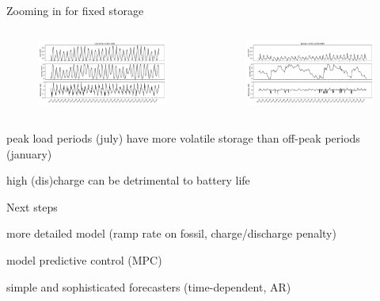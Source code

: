 \documentclass[aspectratio=169,11pt]{beamer}
\begin{document}
\begin{frame}{Zooming in for fixed storage}
\begin{columns}
    \begin{column}{0.5\textwidth}
        \begin{figure}
            \centering
            \includegraphics[width=\columnwidth]{./figures/p7.pdf}
        \end{figure}
    \end{column}
    \begin{column}{0.5\textwidth}
        \begin{figure}
            \centering
            \includegraphics[width=\columnwidth]{./figures/p8.pdf}
        \end{figure}
    \end{column}
\end{columns}
\vfill
\BIT 
\item peak load periods (july) have more volatile storage than off-peak periods (january)
\item high (dis)charge can be detrimental to battery life
\EIT
\end{frame}

\begin{frame}{Next steps} 
\BIT
\item more detailed model (ramp rate on fossil, charge/discharge penalty)
\item model predictive control (MPC)
\item simple and sophisticated forecasters (time-dependent, AR)
\EIT
\end{frame}
    
\end{document}
